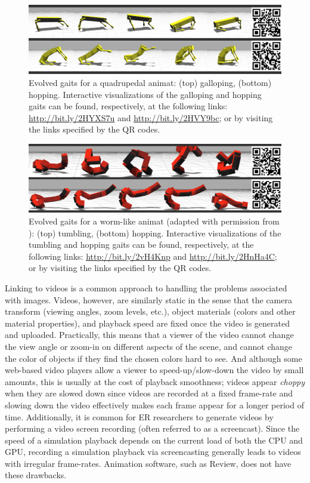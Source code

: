 \begin{figure}[htb!]
\centering
\includegraphics[width=\textwidth]{figures/quadruped.png}
\caption{Evolved gaits for a quadrupedal animat: (top) galloping, (bottom) hopping. Interactive visualizations of the galloping and hopping gaits can be found, respectively, at the following links: \url{http://bit.ly/2HYXS7u} and \url{http://bit.ly/2HVY9bc}; or by visiting the links specified by the QR codes.}
\label{fig:quad_gaits}
\end{figure}

\begin{figure}[htb!]
\centering
\includegraphics[width=\textwidth]{figures/worm.png}
\caption{Evolved gaits for a worm-like animat (adapted with permission from \textcite{Moore.2017.GECCO.Animat}): (top) tumbling, (bottom) hopping. Interactive visualizations of the tumbling and hopping gaits can be found, respectively, at the following links: \url{http://bit.ly/2vH4Knp} and \url{http://bit.ly/2HnHa4C}; or by visiting the links specified by the QR codes.}
\label{fig:worm_gaits}
\end{figure}


Linking to videos is a common approach to handling the problems associated with images.
%
Videos, however, are similarly static in the sense that the camera transform (viewing angles, zoom levels, etc.), object materials (colors and other material properties), and playback speed are fixed once the video is generated and uploaded.
%
Practically, this means that a viewer of the video cannot change the view angle or zoom-in on different aspects of the scene, and cannot change the color of objects if they find the chosen colors hard to see.
%
And although some web-based video players allow a viewer to speed-up/slow-down the video by small amounts, this is usually at the cost of playback smoothness; videos appear \emph{choppy} when they are slowed down since videos are recorded at a fixed frame-rate and slowing down the video effectively makes each frame appear for a longer period of time.
%
Additionally, it is common for ER researchers to generate videos by performing a video screen recording (often referred to as a screencast).
%
Since the speed of a simulation playback depends on the current load of both the CPU and GPU, recording a simulation playback via screencasting generally leads to videos with irregular frame-rates.
%
Animation software, such as Review, does not have these drawbacks.




